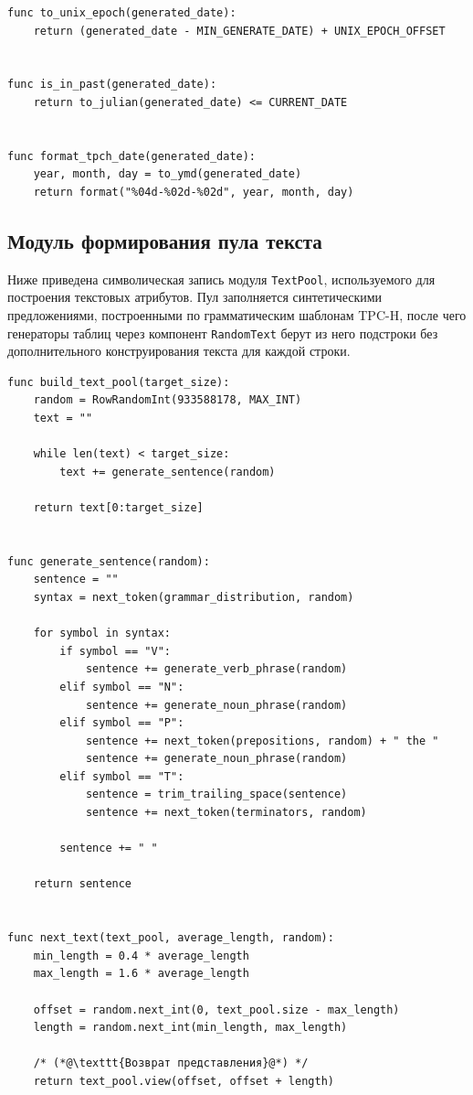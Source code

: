 \begin{lstlisting}[caption={Преобразование дат TPC-H}]
func to_unix_epoch(generated_date):
    return (generated_date - MIN_GENERATE_DATE) + UNIX_EPOCH_OFFSET


func is_in_past(generated_date):
    return to_julian(generated_date) <= CURRENT_DATE


func format_tpch_date(generated_date):
    year, month, day = to_ymd(generated_date)
    return format("%04d-%02d-%02d", year, month, day)
\end{lstlisting}

\subsection{Модуль формирования пула текста}

Ниже приведена символическая запись модуля \texttt{TextPool}, используемого для
построения текстовых атрибутов. Пул заполняется синтетическими предложениями,
построенными по грамматическим шаблонам TPC-H, после чего генераторы таблиц
через компонент \texttt{RandomText} берут из него подстроки без дополнительного
конструирования текста для каждой строки.

\begin{lstlisting}[caption={Формирование и использование TextPool}]
func build_text_pool(target_size):
    random = RowRandomInt(933588178, MAX_INT)
    text = ""

    while len(text) < target_size:
        text += generate_sentence(random)

    return text[0:target_size]


func generate_sentence(random):
    sentence = ""
    syntax = next_token(grammar_distribution, random)

    for symbol in syntax:
        if symbol == "V":
            sentence += generate_verb_phrase(random)
        elif symbol == "N":
            sentence += generate_noun_phrase(random)
        elif symbol == "P":
            sentence += next_token(prepositions, random) + " the "
            sentence += generate_noun_phrase(random)
        elif symbol == "T":
            sentence = trim_trailing_space(sentence)
            sentence += next_token(terminators, random)

        sentence += " "

    return sentence


func next_text(text_pool, average_length, random):
    min_length = 0.4 * average_length
    max_length = 1.6 * average_length

    offset = random.next_int(0, text_pool.size - max_length)
    length = random.next_int(min_length, max_length)

    /* (*@\texttt{Возврат представления}@*) */
    return text_pool.view(offset, offset + length)
\end{lstlisting}

